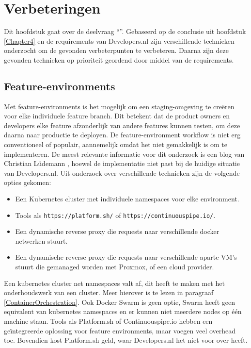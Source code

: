 \chapter{Verbeteringen}

\label{Chapter5}

Dit hoofdstuk gaat over de deelvraag \enquote{\deelverbetering}. Gebaseerd op de conclusie uit hoofdstuk \ref{Chapter4} en de requirements van Developers.nl zijn verschillende technieken onderzocht om de gevonden verbeterpunten te verbeteren. Daarna zijn deze gevonden technieken op prioriteit geordend door middel van de requirements. 

\section{Feature-environments}
Met feature-environments is het mogelijk om een staging-omgeving te creëren voor elke individuele feature branch. Dit betekent dat de product owners en developers elke feature afzonderlijk van andere features kunnen testen, om deze daarna naar productie te deployen. De feature-environment workflow is niet erg conventioneel of populair, aannemelijk omdat het niet gemakkelijk is om te implementeren. De meest relevante informatie voor dit onderzoek is een blog van Christian Lüdemann \parencite{FeatureEnvs}, hoewel de implementatie niet past bij de huidige situatie van Developers.nl. Uit onderzoek over verschillende technieken zijn de volgende opties gekomen:
\begin{itemize}
	\item Een Kubernetes cluster met individuele namespaces voor elke environment.
	\item Tools als \texttt{https://platform.sh/} of \texttt{https://continuouspipe.io/}.
	\item Een dynamische reverse proxy die requests naar verschillende docker netwerken stuurt.
	\item Een dynamische reverse proxy die requests naar verschillende aparte VM's stuurt die gemanaged worden met Proxmox, of een cloud provider.
\end{itemize}

Een kubernetes cluster net namespaces valt af, dit heeft te maken met het onderhoudswerk van een cluster. Meer hierover is te lezen in paragraaf \ref{ContainerOrchestration}. Ook Docker Swarm is geen optie, Swarm heeft geen equivalent van kubernetes namespaces en er kunnen niet meerdere nodes op één machine staan. Tools als Platform.sh of Continuouspipe.io hebben een geïntegreerde oplossing voor feature environments, maar voegen veel overhead toe. Bovendien kost Platform.sh geld, waar Developers.nl het niet voor over heeft.

